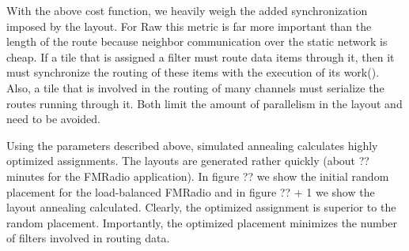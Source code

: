 With the above cost function, we heavily weigh the added
synchronization imposed by the layout.  For Raw this metric is far
more important than the length of the route because neighbor
communication over the static network is cheap.  If a tile that is
assigned a filter must route data items through it, then it must
synchronize the routing of these items with the execution of its
work().  Also, a tile that is involved in the routing of many channels
must serialize the routes running through it.  Both limit the amount
of parallelism in the layout and need to be avoided.

Using the parameters described above, simulated annealing calculates
highly optimized assignments.  The layouts are generated rather
quickly (about ?? minutes for the FMRadio application).  In figure ??
we show the initial random placement for the load-balanced FMRadio and
in figure ?? + 1 we show the layout annealing calculated.  Clearly,
the optimized assignment is superior to the random placement.
Importantly, the optimized placement minimizes the number of filters
involved in routing data.
